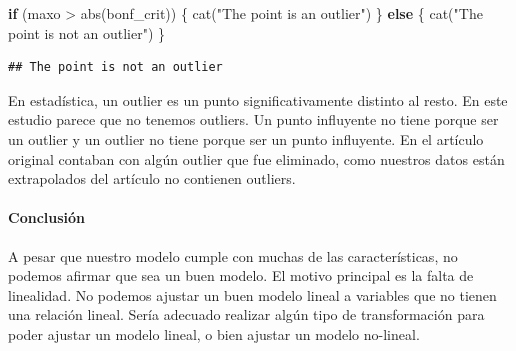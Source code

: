 \documentclass[
]{article}
\newenvironment{Shaded}{\begin{snugshade}}{\end{snugshade}}
\newcommand{\AttributeTok}[1]{\textcolor[rgb]{0.77,0.63,0.00}{#1}}
\newcommand{\CommentTok}[1]{\textcolor[rgb]{0.56,0.35,0.01}{\textit{#1}}}
\newcommand{\ControlFlowTok}[1]{\textcolor[rgb]{0.13,0.29,0.53}{\textbf{#1}}}
\newcommand{\DecValTok}[1]{\textcolor[rgb]{0.00,0.00,0.81}{#1}}
\newcommand{\FloatTok}[1]{\textcolor[rgb]{0.00,0.00,0.81}{#1}}
\newcommand{\FunctionTok}[1]{\textcolor[rgb]{0.00,0.00,0.00}{#1}}
\newcommand{\NormalTok}[1]{#1}
\newcommand{\OtherTok}[1]{\textcolor[rgb]{0.56,0.35,0.01}{#1}}
\newcommand{\SpecialCharTok}[1]{\textcolor[rgb]{0.00,0.00,0.00}{#1}}
\newcommand{\StringTok}[1]{\textcolor[rgb]{0.31,0.60,0.02}{#1}}
\begin{document}
\begin{Shaded}
\end{Shaded}

\begin{Shaded}
\begin{Highlighting}[]
\ControlFlowTok{if}\NormalTok{ (maxo }\SpecialCharTok{\textgreater{}} \FunctionTok{abs}\NormalTok{(bonf\_crit)) \{}
  \FunctionTok{cat}\NormalTok{(}\StringTok{"The point is an outlier"}\NormalTok{)}
\NormalTok{\} }\ControlFlowTok{else}\NormalTok{ \{}
  \FunctionTok{cat}\NormalTok{(}\StringTok{"The point is not an outlier"}\NormalTok{)}
\NormalTok{\}}
\end{Highlighting}
\end{Shaded}

\begin{verbatim}
## The point is not an outlier
\end{verbatim}

En estadística, un outlier es un punto significativamente distinto al
resto. En este estudio parece que no tenemos outliers. Un punto
influyente no tiene porque ser un outlier y un outlier no tiene porque
ser un punto influyente. En el artículo original contaban con algún
outlier que fue eliminado, como nuestros datos están extrapolados del
artículo no contienen outliers.

\hypertarget{conclusiuxf3n}{%
\paragraph{Conclusión}\label{conclusiuxf3n}}

A pesar que nuestro modelo cumple con muchas de las características, no
podemos afirmar que sea un buen modelo. El motivo principal es la falta
de linealidad. No podemos ajustar un buen modelo lineal a variables que
no tienen una relación lineal. Sería adecuado realizar algún tipo de
transformación para poder ajustar un modelo lineal, o bien ajustar un
modelo no-lineal.
\end{document}
